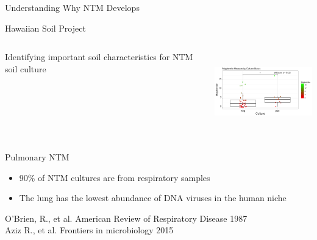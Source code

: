 \documentclass[11pt]{beamer}
\begin{document}
	\begin{frame}{Understanding Why NTM Develops}
	
	\begin{block}{Hawaiian Soil Project}
	\vspace{0.3cm}
		\begin{columns}
		Identifying important soil characteristics for NTM soil culture 
	
		
		
		
		\includegraphics[height=3.5cm, width=5cm]{soil.jpeg}
		\end{columns}
	
	\end{block}
	
	\begin{block}{Pulmonary NTM}
	\begin{itemize}
	\item 90\% of NTM cultures are from respiratory samples
	\item The lung has the lowest abundance of DNA viruses in the human niche
	\end{itemize}
	\end{block}
	
	\vspace{0.3cm}
	
	\tiny{O'Brien, R., et al. American Review of Respiratory Disease 1987 \\ Aziz R., et al. Frontiers in microbiology 2015}

	
	\end{frame}
	
\end{document}
